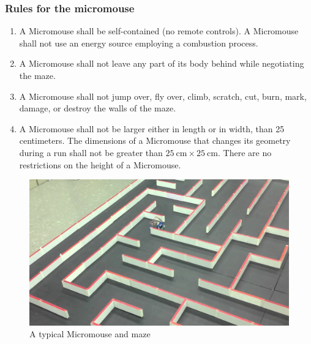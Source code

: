\documentclass[10pt,twocolumn,letterpaper]{article}
\begin{document}
\subsubsection{Rules for the micromouse}
\label{ssub:mouserules}
\begin{enumerate}
	\item A Micromouse shall be self-contained (no remote controls). A Micromouse shall not use an energy source
	employing a combustion process.
	\item A Micromouse shall not leave any part of its body behind while negotiating the maze.
	\item A Micromouse shall not jump over, fly over, climb, scratch, cut, burn, mark, damage, or destroy
	the walls of the maze.
	\item A Micromouse shall not be larger either in length or in width, than 25 centimeters. The dimensions of a
	Micromouse that changes its geometry during a run shall not be greater than $25\ \textrm{cm} \times 25\
	\textrm{cm}$. There are no restrictions on the height of a Micromouse.
\end{enumerate}

\begin{figure}[b]
\begin{center}
	\includegraphics[width=0.8\linewidth]{images/mouse_and_maze.jpg}
\end{center}
\caption{A typical Micromouse and maze}
\label{fig:mouse_and_maze}
\end{figure}
\end{document}
